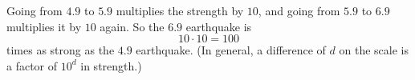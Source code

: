 Going from $4.9$ to $5.9$ multiplies the strength by $10$, and going from $5.9$ to $6.9$ multiplies it by $10$ again. So the $6.9$ earthquake is
\[
10\cdot10=\boxed{100}
\]
times as strong as the $4.9$ earthquake. (In general, a difference of $d$ on the scale is a factor of $10^d$ in strength.)
